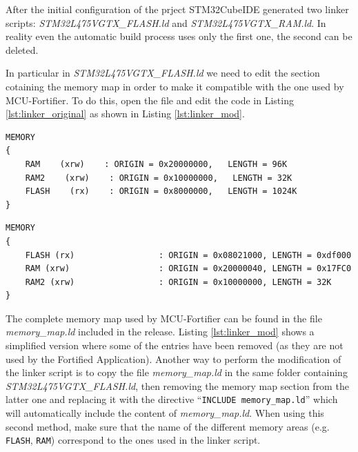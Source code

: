 \documentclass{article}
\begin{document}
After the initial configuration of the prject STM32CubeIDE generated two linker scripts: \textit{STM32L475VGTX\_FLASH.ld} and \textit{STM32L475VGTX\_RAM.ld}. In reality even the automatic build process uses only the first one, the second can be deleted.

In particular in \textit{STM32L475VGTX\_FLASH.ld} we need to edit the section cotaining the memory map in order to make it compatible with the one used by MCU-Fortifier. To do this, open the file and edit the code in Listing \ref{lst:linker_original} as shown in Listing \ref{lst:linker_mod}.

\begin{lstlisting}[caption={Original memory map of linker script},captionpos=b,label=lst:linker_original]
MEMORY
{
	RAM    (xrw)    : ORIGIN = 0x20000000,   LENGTH = 96K
	RAM2    (xrw)    : ORIGIN = 0x10000000,   LENGTH = 32K
	FLASH    (rx)    : ORIGIN = 0x8000000,   LENGTH = 1024K
}
\end{lstlisting}


\begin{lstlisting}[caption={New memory map compatible with MCU-Fortifier},captionpos=b,label=lst:linker_mod]
MEMORY
{
	FLASH (rx)                 : ORIGIN = 0x08021000, LENGTH = 0xdf000
	RAM (xrw)                  : ORIGIN = 0x20000040, LENGTH = 0x17FC0
	RAM2 (xrw)                 : ORIGIN = 0x10000000, LENGTH = 32K
}
\end{lstlisting}
The complete memory map used by MCU-Fortifier can be found in the file \textit{memory\_map.ld} included in the release. Listing \ref{lst:linker_mod} shows a simplified version where some of the entries have been removed (as they are not used by the Fortified Application). Another way to perform the modification of the linker script is to copy the file \textit{memory\_map.ld} in the same folder containing \textit{STM32L475VGTX\_FLASH.ld}, then removing the memory map section from the latter one and replacing it with the directive ``\verb|INCLUDE memory_map.ld|'' which will automatically include the content of \textit{memory\_map.ld}. When using this second method, make sure that the name of the different memory areas (e.g. \verb|FLASH|, \verb|RAM|) correspond to the ones used in the linker script.
\end{document}
